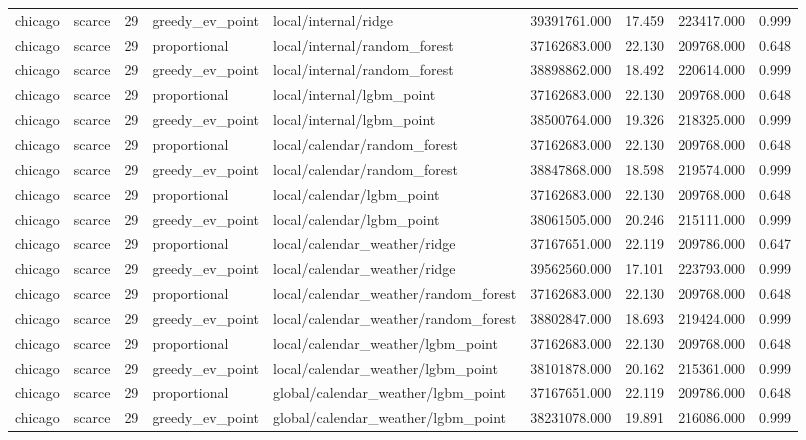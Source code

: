 \begin{tabular}{llrllrrrr}
chicago & scarce & 29 & greedy\_ev\_point & local/internal/ridge & 39391761.000 & 17.459 & 223417.000 & 0.999 \\
chicago & scarce & 29 & proportional & local/internal/random\_forest & 37162683.000 & 22.130 & 209768.000 & 0.648 \\
chicago & scarce & 29 & greedy\_ev\_point & local/internal/random\_forest & 38898862.000 & 18.492 & 220614.000 & 0.999 \\
chicago & scarce & 29 & proportional & local/internal/lgbm\_point & 37162683.000 & 22.130 & 209768.000 & 0.648 \\
chicago & scarce & 29 & greedy\_ev\_point & local/internal/lgbm\_point & 38500764.000 & 19.326 & 218325.000 & 0.999 \\
chicago & scarce & 29 & proportional & local/calendar/random\_forest & 37162683.000 & 22.130 & 209768.000 & 0.648 \\
chicago & scarce & 29 & greedy\_ev\_point & local/calendar/random\_forest & 38847868.000 & 18.598 & 219574.000 & 0.999 \\
chicago & scarce & 29 & proportional & local/calendar/lgbm\_point & 37162683.000 & 22.130 & 209768.000 & 0.648 \\
chicago & scarce & 29 & greedy\_ev\_point & local/calendar/lgbm\_point & 38061505.000 & 20.246 & 215111.000 & 0.999 \\
chicago & scarce & 29 & proportional & local/calendar\_weather/ridge & 37167651.000 & 22.119 & 209786.000 & 0.647 \\
chicago & scarce & 29 & greedy\_ev\_point & local/calendar\_weather/ridge & 39562560.000 & 17.101 & 223793.000 & 0.999 \\
chicago & scarce & 29 & proportional & local/calendar\_weather/random\_forest & 37162683.000 & 22.130 & 209768.000 & 0.648 \\
chicago & scarce & 29 & greedy\_ev\_point & local/calendar\_weather/random\_forest & 38802847.000 & 18.693 & 219424.000 & 0.999 \\
chicago & scarce & 29 & proportional & local/calendar\_weather/lgbm\_point & 37162683.000 & 22.130 & 209768.000 & 0.648 \\
chicago & scarce & 29 & greedy\_ev\_point & local/calendar\_weather/lgbm\_point & 38101878.000 & 20.162 & 215361.000 & 0.999 \\
chicago & scarce & 29 & proportional & global/calendar\_weather/lgbm\_point & 37167651.000 & 22.119 & 209786.000 & 0.648 \\
chicago & scarce & 29 & greedy\_ev\_point & global/calendar\_weather/lgbm\_point & 38231078.000 & 19.891 & 216086.000 & 0.999 \\

\end{tabular}
